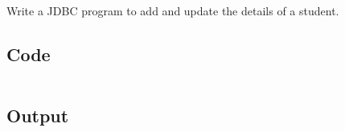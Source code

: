 \documentclass[../main.tex]{subfiles}
\begin{document}
Write a JDBC program to add and update the details of a student.

\subsection{Code}
\inputminted[frame=lines, breaklines, breakanywhere, numberblanklines=false]{java}{./programs/prog23/Student.java}

\subsection{Output}
\end{document}
